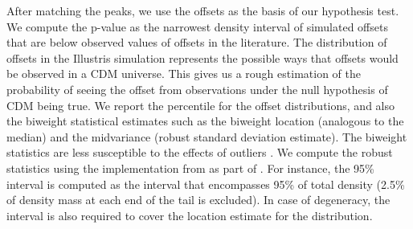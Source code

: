 After matching the peaks, we use the offsets as the basis of our 
 hypothesis test. 
We compute the p-value as the narrowest density interval of simulated offsets 
that are below observed values of 
offsets in the literature. The distribution of offsets in the Illustris
simulation represents the possible ways that offsets would be observed in a CDM
universe.
This gives us a rough estimation of the probability 
of seeing the offset from observations under the null hypothesis of CDM 
being true. 
We report the percentile for the offset distributions, and also the biweight 
statistical estimates such as the biweight 
location (analogous to the median)
and the midvariance (robust standard deviation
estimate). The biweight statistics are less susceptible to the effects of
outliers \citep{Beers90}. We compute the robust statistics using the implementation
from \cite{astropy} as part of {}. 
For instance, the 95\% interval is computed as the interval that encompasses
95\% of total density (2.5\% of density mass at each end of the tail is
excluded). In case of degeneracy, the interval is also required to cover the 
location estimate for the distribution.

